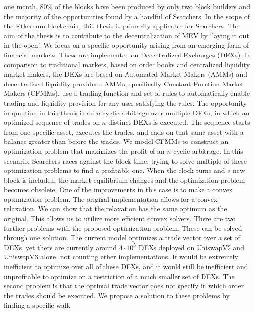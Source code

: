 one month, $80\%$ of the blocks have been produced by only two block
builders and the majority of the opportunities found by a handful of
Searchers.
\newline
In the scope of the Ethereum blockchain, this thesis is primarily applicable
for Searchers. The aim of the thesis is to contribute to the decentralization
of MEV by `laying it out in the open'.
\newline
We focus on a specific opportunity arising from an emerging form of financial
markets. These are implemented on Decentralized Exchanges (DEXs). In
comparison to traditional markets, based on order books and centralized
liquidity market makers, the DEXs are based on Automated Market Makers (AMMs)
and decentralized liquidity providers. AMMs, specifically Constant Function
Market Makers (CFMMs), use a trading function and set of rules to
automatically enable trading and liquidity provision for any user satisfying
the rules. The opportunity in question in this thesis is an $n$-cyclic
arbitrage over multiple DEXs, in which an optimized sequence of trades on $n$
distinct DEXs is executed. The sequence starts from one specific asset,
executes the trades, and ends on that same asset with a balance greater than
before the trades. We model CFMMs to construct an optimization problem that
maximizes the profit of an $n$-cyclic arbitrage. In this scenario, Searchers
races against the block time, trying to solve multiple of these optimization
problems to find a profitable one. When the clock turns and a new block
is included, the market equilibrium changes and the optimization problem
becomes obsolete. One of the improvements in this case is to make a convex
optimization problem. The original implementation allows for a convex
relaxation. We can show that the relaxation has the same optimum as the
original. This allows us to utilize more efficient convex solvers.
\newline
There are two further problems with the proposed optimization problem. These
can be solved through one solution. The current model optimizes a trade
vector over a set of DEXs, yet there are currently around $4 \cdot 10^{5}$
DEXs deployed on UniswapV2 and UniswapV3 \cite{uniswap} alone, not counting
other implementations. It would be extremely inefficient to optimize over all
of these DEXs, and it would still be inefficient and unprofitable to optimize
on a restriction of a much smaller set of DEXs. The second problem is that the
optimal trade vector does not specify in which order the trades should be
executed. We propose a solution to these problems by finding a specific walk

